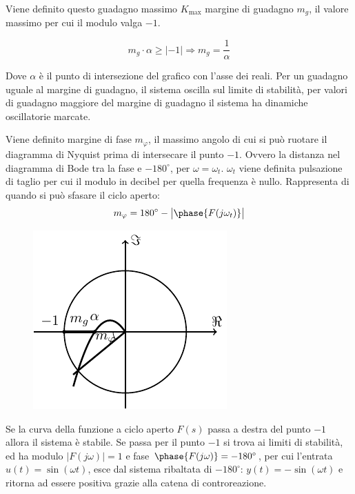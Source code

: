 \documentclass{article}
\numberwithin{equation}{subsection}
\begin{document}
Viene definito questo guadagno massimo $K_{\max}$ margine di guadagno $m_g$, il valore massimo per cui il modulo valga $-1$. 

\begin{equation}
    m_g\cdot\alpha\geq|-1|\Rightarrow m_g=\displaystyle\frac{1}{\alpha}
\end{equation}

Dove $\alpha$ è il punto di intersezione del grafico con l'asse dei reali. Per un guadagno uguale al margine di guadagno, il sistema oscilla sul limite di stabilità, 
per valori di guadagno maggiore del margine di guadagno il sistema ha dinamiche oscillatorie marcate. 


Viene definito margine di fase $m_{\varphi}$, il massimo angolo di cui si può ruotare il diagramma di Nyquist prima di intersecare il punto $-1$. Ovvero la distanza nel diagramma di Bode 
tra la fase e $-180^{\circ}$, per $\omega=\omega_t$. $\omega_t$ viene definita pulsazione di taglio per cui il modulo in decibel per quella frequenza è nullo. Rappresenta 
di quando si può sfasare il ciclo aperto:
\begin{equation}
    m_{\varphi}=180^{\circ}-\big|\phase{F(j\omega_t)}\big|
\end{equation}
\begin{figure}[H]%
    \centering
    \includegraphics{nyquist-5.pdf}%
\end{figure}

Se la curva della funzione a ciclo aperto $F(s)$ passa a destra del punto $-1$ allora il sistema è stabile. Se passa per il punto $-1$ si trova ai limiti di 
stabilità, ed ha modulo $|F(j\omega)|=1$ e fase $\phase{F(j\omega)}=-180^{\circ}$, per cui l'entrata $u(t)=\sin(\omega t)$, esce dal sistema ribaltata di $-180^{\circ}$: 
$y(t)=-\sin(\omega t)$ e ritorna ad essere positiva grazie alla catena di controreazione. 
\end{document}
